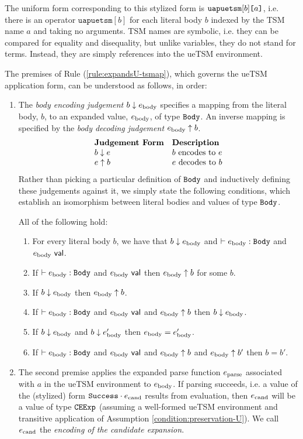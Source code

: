 The uniform form corresponding to this stylized form is $\texttt{uapuetsm}[b]\texttt{[}a\texttt{]}$, i.e. there is an operator $\texttt{uapuetsm}[b]$ for each literal body $b$ indexed by the TSM name $a$ and taking no arguments. TSM names are symbolic, i.e. they can be compared for equality and disequality, but unlike variables, they do not stand for terms. Instead, they are simply references into the ueTSM environment. 

The premises of Rule (\ref{rule:expandsU-tsmap}), which governs the ueTSM application form, can be understood as follows, in order:
\begin{enumerate}
\item The \emph{body encoding judgement} $b \downarrow e_\text{body}$ specifies a mapping from the literal body, $b$, to an expanded value, $e_\text{body}$, of type $\mathtt{Body}$. An inverse mapping is specified by the \emph{body decoding judgement} $e_\text{body} \uparrow b$.
\[\begin{array}{ll}
\textbf{Judgement Form} & \textbf{Description}\\
b \downarrow e & \text{$b$ encodes to $e$}\\
e \uparrow b & \text{$e$ decodes to $b$}
\end{array}\]
Rather than picking a particular definition of $\mathtt{Body}$ and inductively defining these judgements against it, we simply state the following conditions, which establish an isomorphism between literal bodies and values of type $\mathtt{Body}$.
\begin{condition} All of the following hold:
\begin{enumerate}
\item For every literal body $b$, we have that $b \downarrow e_\text{body}$ and $\vdash e_\text{body} : \mathtt{Body}$ and $e_\text{body}~\mathsf{val}$.
\item If $\vdash e_\text{body} : \mathtt{Body}$ and $e_\text{body}~\mathsf{val}$ then $e_\text{body} \uparrow b$ for some $b$.
\item If $b \downarrow e_\text{body}$ then $e_\text{body} \uparrow b$.
\item If $\vdash e_\text{body} : \mathtt{Body}$ and $e_\text{body}~\mathsf{val}$ and $e_\text{body} \uparrow b$ then $b \downarrow e_\text{body}$. 
\item If $b \downarrow e_\text{body}$ and $b \downarrow e_\text{body}'$ then $e_\text{body} = e_\text{body}'$.
\item If $\vdash e_\text{body} : \mathtt{Body}$ and $e_\text{body}~\mathsf{val}$ and $e_\text{body} \uparrow b$ and $e_\text{body} \uparrow b'$ then $b=b'$.
\end{enumerate}
\end{condition}
\item The second premise applies the expanded parse function $e_\text{parse}$ associated with $a$ in the ueTSM environment to $e_\text{body}$. If parsing succeeds, i.e. a value of the (stylized) form $\mathtt{Success} \cdot e_\text{cand}$ results from evaluation, then $e_\text{cand}$ will be a value of type $\mathtt{CEExp}$ (assuming a well-formed ueTSM environment and transitive application of Assumption \ref{condition:preservation-U}). We call $e_\text{cand}$ the \emph{encoding of the candidate expansion}.


\end{enumerate}
